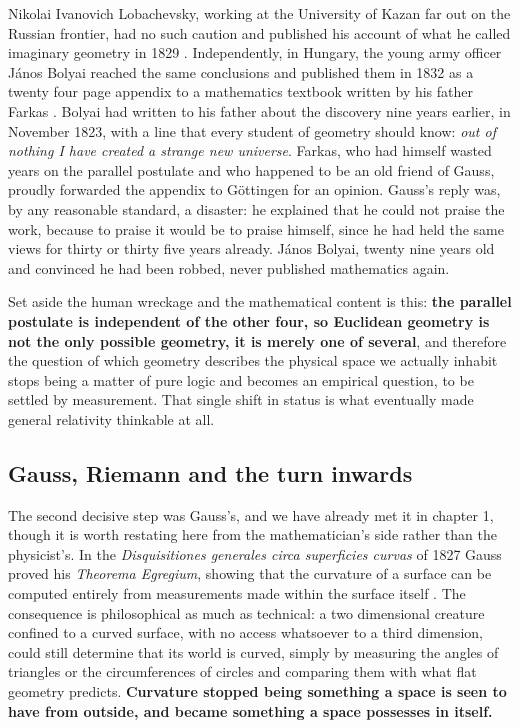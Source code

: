         Nikolai Ivanovich Lobachevsky, working at the University of Kazan far out on the Russian frontier, had no such caution and published his account of what he called imaginary geometry in 1829 \citep{lobachevsky1829}. Independently, in Hungary, the young army officer János Bolyai reached the same conclusions and published them in 1832 as a twenty four page appendix to a mathematics textbook written by his father Farkas \citep{bolyai1832}. Bolyai had written to his father about the discovery nine years earlier, in November 1823, with a line that every student of geometry should know: \textit{out of nothing I have created a strange new universe}. Farkas, who had himself wasted years on the parallel postulate and who happened to be an old friend of Gauss, proudly forwarded the appendix to Göttingen for an opinion. Gauss's reply was, by any reasonable standard, a disaster: he explained that he could not praise the work, because to praise it would be to praise himself, since he had held the same views for thirty or thirty five years already. János Bolyai, twenty nine years old and convinced he had been robbed, never published mathematics again.

        Set aside the human wreckage and the mathematical content is this: \textbf{the parallel postulate is independent of the other four, so Euclidean geometry is not the only possible geometry, it is merely one of several}, and therefore the question of which geometry describes the physical space we actually inhabit stops being a matter of pure logic and becomes an empirical question, to be settled by measurement. That single shift in status is what eventually made general relativity thinkable at all.

    \subsection{Gauss, Riemann and the turn inwards}

        The second decisive step was Gauss's, and we have already met it in chapter 1, though it is worth restating here from the mathematician's side rather than the physicist's. In the \textit{Disquisitiones generales circa superficies curvas} of 1827 Gauss proved his \textit{Theorema Egregium}, showing that the curvature of a surface can be computed entirely from measurements made within the surface itself \citep{gauss1828}. The consequence is philosophical as much as technical: a two dimensional creature confined to a curved surface, with no access whatsoever to a third dimension, could still determine that its world is curved, simply by measuring the angles of triangles or the circumferences of circles and comparing them with what flat geometry predicts. \textbf{Curvature stopped being something a space is seen to have from outside, and became something a space possesses in itself.}

